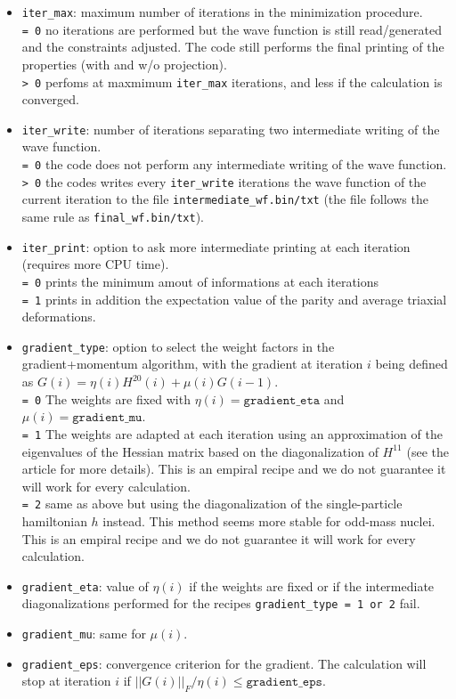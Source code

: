 \documentclass[a4paper,11pt]{article}
\newcommand{\ttt}[1]{\texttt{#1}}
\begin{document}
\begin{itemize}
\item \ttt{iter\_max}: maximum number of iterations in the minimization procedure. \\[0.05cm]
 \ttt{= 0\:} no iterations are performed but the wave function is still read/generated and the constraints adjusted. The code still performs the final
             printing of the properties (with and w/o projection). \\[0.05cm]
 \ttt{> 0\:} perfoms at maxmimum \ttt{iter\_max} iterations, and less if the calculation is converged.
\item \ttt{iter\_write}: number of iterations separating two intermediate writing of the wave function. \\[0.05cm]
 \ttt{= 0\:} the code does not perform any intermediate writing of the wave function. \\[0.05cm]
 \ttt{> 0\:} the codes writes every \ttt{iter\_write} iterations the wave function of the current iteration to the file
             \ttt{intermediate\_wf.bin/txt} (the file follows the same rule as \ttt{final\_wf.bin/txt}).
\item \ttt{iter\_print}: option to ask more intermediate printing at each iteration (requires more CPU time). \\[0.05cm]
 \ttt{= 0\:} prints the minimum amout of informations at each iterations \\[0.05cm]
 \ttt{= 1\:} prints in addition the expectation value of the parity and average triaxial deformations.
\item \ttt{gradient\_type}: option to select the weight factors in the gradient+momentum algorithm, with the gradient at iteration $i$ being 
  defined as $G(i) = \eta(i) H^{20}(i) + \mu(i) G(i-1)$. \\[0.05cm]
 \ttt{= 0\:} The weights are fixed with $\eta(i) = \ttt{gradient\_eta}$ and $\mu(i) = \ttt{gradient\_mu}$. \\[0.05cm]
 \ttt{= 1\:} The weights are adapted at each iteration using an approximation of the eigenvalues of the Hessian matrix based on
             the diagonalization of $H^{11}$ (see the article for more details). 
             This is an empiral recipe and we do not guarantee it will work for every calculation. \\[0.05cm]
 \ttt{= 2\:} same as above but using the diagonalization of the single-particle hamiltonian $h$ instead. This method seems 
              more stable for odd-mass nuclei.
             This is an empiral recipe and we do not guarantee it will work for every calculation. 
\item \ttt{gradient\_eta}: value of $\eta(i)$ if the weights are fixed or if the intermediate diagonalizations performed
             for the recipes \ttt{gradient\_type = 1 or 2} fail.
\item \ttt{gradient\_mu}: same for $\mu(i)$. 
\item \ttt{gradient\_eps}: convergence criterion for the gradient. The calculation will stop at iteration $i$ if 
      $||G(i)||_F / \eta(i) \le \ttt{gradient\_eps}$.
 
\end{itemize}
\end{document}
